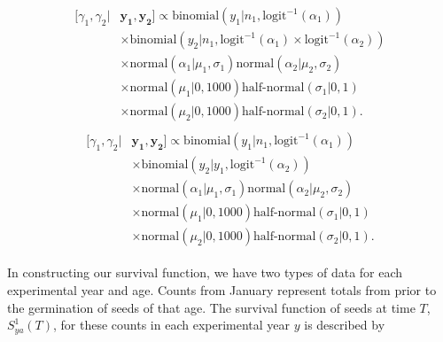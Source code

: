 \documentclass[12pt, oneside, titlepage]{article}   	%
\begin{document}
\begin{align}
  \begin{split}
 [  \gamma_1, \gamma_2  | & \bm{y_1} , \bm{y_2} ] \propto 
   \mathrm{binomial} ( y_1 | n_1, \mathrm{logit}^{-1}( \alpha_1 ) )  
      \\ & \times \mathrm{binomial} ( y_2 | n_1, \mathrm{logit}^{-1}( \alpha_1 ) \times \mathrm{logit}^{-1}( \alpha_2 ) ) 
   \\ & \times \mathrm{normal} ( \alpha_1  | \mu_1, \sigma_1 ) \mathrm{normal} ( \alpha_2  | \mu_2, \sigma_2 )
  \\ & \times \mathrm{normal} ( \mu_1 | 0 , 1000 ) \textrm{half-normal} ( \sigma_1 | 0,1)
    \\ & \times \mathrm{normal} ( \mu_2 | 0 , 1000 ) \textrm{half-normal} ( \sigma_2 | 0,1).
  \end{split}
\end{align}
%
\begin{align}
  \begin{split}
 [  \gamma_1, \gamma_2  | & \bm{y_1} , \bm{y_2} ] \propto 
   \mathrm{binomial} ( y_1 | n_1, \mathrm{logit}^{-1}( \alpha_1 ) )
      \\ & \times  \mathrm{binomial} ( y_2 | y_1, \mathrm{logit}^{-1}( \alpha_2 ) ) 
   \\ & \times \mathrm{normal} ( \alpha_1  | \mu_1, \sigma_1 ) \mathrm{normal} ( \alpha_2  | \mu_2, \sigma_2 )
  \\ & \times \mathrm{normal} ( \mu_1 | 0 , 1000 ) \textrm{half-normal} ( \sigma_1 | 0,1)
    \\ & \times \mathrm{normal} ( \mu_2 | 0 , 1000 ) \textrm{half-normal} ( \sigma_2 | 0,1).
  \end{split}
\end{align}
%

\clearpage
\newpage

\fi


\iffalse


In constructing our survival function, we have two types of data for each experimental year and age. Counts from January represent totals from prior to the germination of seeds of that age. The survival function of seeds at time $T$, $S^1_{ya}(T)$, for these counts in each experimental year $y$ is described by 
%
%
\end{document}
